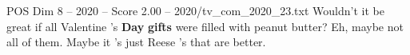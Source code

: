 \begin{textsample}{POS Dim 8 – 2020 – Score 2.00 – 2020/tv\_com\_2020\_23.txt}  \label{ex:f8_pos_022}
Wouldn't it be great if all Valentine 's \textbf{Day} \textbf{gifts} were filled with peanut butter?
Eh, maybe not all of them.
Maybe it 's just Reese 's that are better.

\end{textsample}
